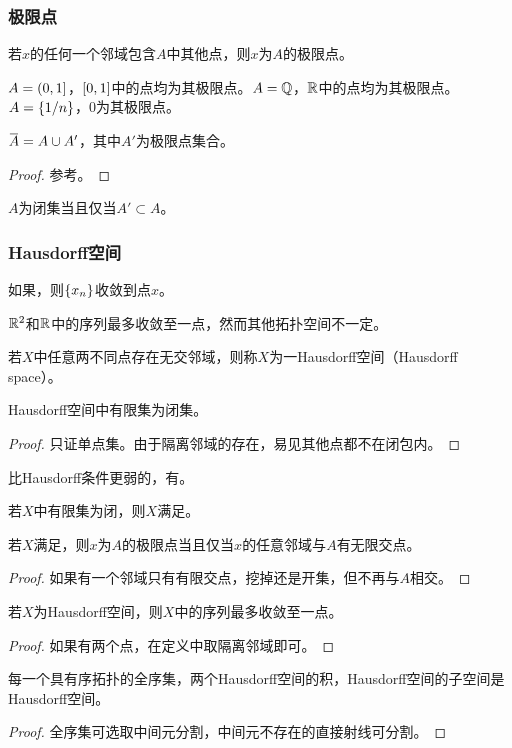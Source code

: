 \documentclass{ctexrep}
\begin{document}
  \subsubsection{极限点}
  \begin{definition}
    若$x$的任何一个邻域包含$A$中其他点，则$x$为$A$的极限点。
  \end{definition}
  \begin{ex}
    $A=\left(0,1\right]$，$\left[0,1\right]$中的点均为其极限点。$A=\mathbb{Q}$，$\mathbb{R}$中的点均为其极限点。$A=\left\{1/n\right\}$，$0$为其极限点。
  \end{ex}
  \begin{theorem}
  \label{thm:closureeq}
  $\clo{A} = A\cup A'$，其中$A'$为极限点集合。
  \end{theorem}
  \begin{proof}
    参考。
  \end{proof}
  \begin{collary}
  $A$为闭集当且仅当$A'\subset A$。
  \end{collary}
  \subsubsection{Hausdorff空间}
  \begin{definition}
    \label{def:converge}
    如果，则$\left\{x_n\right\}$收敛到点$x$。
  \end{definition}
  $\mathbb{R}^2$和$\mathbb{R}$中的序列最多收敛至一点，然而其他拓扑空间不一定。
  \begin{definition}
    若$X$中任意两不同点存在无交邻域，则称$X$为一Hausdorff空间（Hausdorff space）。
  \end{definition}
  \begin{theorem}
    Hausdorff空间中有限集为闭集。
  \end{theorem}
  \begin{proof}
    只证单点集。由于隔离邻域的存在，易见其他点都不在闭包内。
  \end{proof}
  比Hausdorff条件更弱的，有\tuno 。
  \begin{definition}
    若$X$中有限集为闭，则$X$满足\tuno 。
  \end{definition}
  \begin{theorem}
    若$X$满足\tuno ，则$x$为$A$的极限点当且仅当$x$的任意邻域与$A$有无限交点。
  \end{theorem}
  \begin{proof}
    如果有一个邻域只有有限交点，挖掉还是开集，但不再与$A$相交。
  \end{proof}
  \begin{theorem}
    \label{thm:hausonepoint}
    若$X$为Hausdorff空间，则$X$中的序列最多收敛至一点。
  \end{theorem}
  \begin{proof}
    如果有两个点，在定义中取隔离邻域即可。
  \end{proof}
  \begin{theorem}
  每一个具有序拓扑的全序集，两个Hausdorff空间的积，Hausdorff空间的子空间是Hausdorff空间。
  \end{theorem}
  \begin{proof}
    全序集可选取中间元分割，中间元不存在的直接射线可分割。
  \end{proof}
\end{document}
